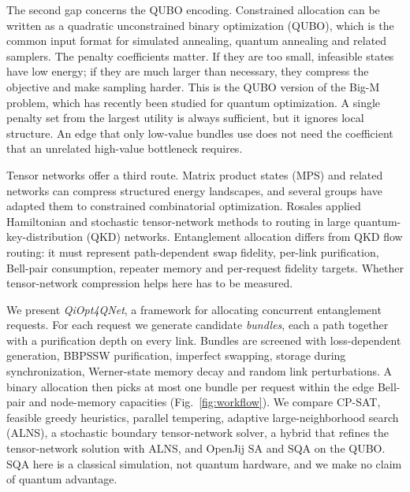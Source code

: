 \documentclass[pdflatex,sn-nature]{sn-jnl}
\theoremstyle{plain}
\theoremstyle{remark}
\begin{document}
The second gap concerns the QUBO encoding. Constrained allocation can be written as a quadratic unconstrained binary optimization (QUBO), which is the common input format for simulated annealing, quantum annealing and related samplers\cite{lucas2014,glover2019,kadowaki1998}. The penalty coefficients matter. If they are too small, infeasible states have low energy; if they are much larger than necessary, they compress the objective and make sampling harder\cite{verma2022,diez2022}. This is the QUBO version of the Big-M problem, which has recently been studied for quantum optimization\cite{alessandroni2025}. A single penalty set from the largest utility is always sufficient, but it ignores local structure. An edge that only low-value bundles use does not need the coefficient that an unrelated high-value bottleneck requires.

Tensor networks offer a third route. Matrix product states (MPS) and related networks can compress structured energy landscapes\cite{white1992,vidal2003,schollwock2011,orus2014}, and several groups have adapted them to constrained combinatorial optimization\cite{hao2022,nakada2025,preisser2026}. Rosales applied Hamiltonian and stochastic tensor-network methods to routing in large quantum-key-distribution (QKD) networks\cite{rosales2026}. Entanglement allocation differs from QKD flow routing: it must represent path-dependent swap fidelity, per-link purification, Bell-pair consumption, repeater memory and per-request fidelity targets. Whether tensor-network compression helps here has to be measured.

We present \emph{QiOpt4QNet}, a framework for allocating concurrent entanglement requests. For each request we generate candidate \emph{bundles}, each a path together with a purification depth on every link. Bundles are screened with loss-dependent generation, BBPSSW purification, imperfect swapping, storage during synchronization, Werner-state memory decay and random link perturbations. A binary allocation then picks at most one bundle per request within the edge Bell-pair and node-memory capacities (Fig.~\ref{fig:workflow}). We compare CP-SAT\cite{perron2023}, feasible greedy heuristics, parallel tempering\cite{hukushima1996}, adaptive large-neighborhood search (ALNS)\cite{ropke2006}, a stochastic boundary tensor-network solver, a hybrid that refines the tensor-network solution with ALNS, and OpenJij SA and SQA on the QUBO. SQA here is a classical simulation, not quantum hardware, and we make no claim of quantum advantage.
\end{document}

